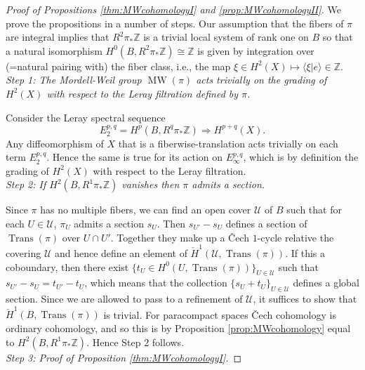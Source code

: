 \documentclass[10pt,letterpaper]{amsart}
\numberwithin{equation}{section}
\def\ZZ{{\mathbb Z}}
\def\Uscr{{\mathscr U}}
\def\la{\langle}
\def\ra{\rangle}
\newcommand\MW{\operatorname{MW}}
\newcommand\Trans{\operatorname{Trans}}
\theoremstyle{remark}
\begin{document}
\begin{proof}[Proof of  Propositions  \ref{thm:MWcohomologyI} and \ref{prop:MWcohomologyII}]
We prove the propositions  in a number of steps.
Our assumption that the fibers of $\pi$ are integral implies that 
$R^2\pi_*\ZZ$ is  a trivial local system of rank one on $B$ so that a natural isomorphism  $H^0(B, R^2\pi_*\ZZ)\cong \ZZ 
$ is given by integration over (=natural pairing with) the fiber class, i.e., the map $\xi\in H^2(X)\mapsto \la \xi|e\ra \in \ZZ$.
\\

\emph{Step 1: The Mordell-Weil group $\MW(\pi)$ acts trivially on the grading of $H^2(X)$ with respect to  the Leray filtration defined by $\pi$. }

Consider the Leray spectral sequence
\[
E_2^{p,q}= H^p(B, R^q\pi_*\ZZ)\Rightarrow H^{p+q}(X).
\]  
Any diffeomorphism of $X$ that is a fiberwise-translation acts trivially on each term $E_2^{p,q}$. Hence the same is true for  its action  on $E_\infty^{p,q}$, which is by definition the grading of $H^2(X)$ with respect to  the Leray filtration.  
\\

\emph{Step 2: If $H^{2}(B,R^1\pi_*\ZZ)$ vanishes then $\pi$ admits a section.}

Since $\pi$ has no multiple fibers, we can find  an open cover $\Uscr$ of  $B$ such that  for each $U\in \Uscr$, $\pi_{U}$ admits a section $s_U$. Then $s_{U'}-s_U$ defines a section of $\Trans(\pi)$ over $U\cap U'$. Together they make up a \v{C}ech $1$-cycle relative the covering $\Uscr$ and hence define an element of $\check{H}^1(\Uscr,\Trans(\pi))$. If this a coboundary, then
there exist $\{t_U\in H^0(U, \Trans(\pi))\}_{U\in \Uscr}$ such that $s_{U'}-s_U=t_{U'}-t_U$, which means that the collection $\{s_U+t_U\}_{U\in\Uscr}$ defines a global section. Since we are allowed to pass to a refinement of $\Uscr$, it suffices to show that $\check{H}^1(B,\Trans(\pi))$ is trivial. For paracompact spaces \v{C}ech cohomology is ordinary cohomology, and so this  is  by Proposition \ref{prop:MWcohomology} equal to $H^{2}(B,R^1\pi_*\ZZ)$. 
Hence Step 2 follows.
\\

\emph{Step 3: Proof  of  Proposition \ref{thm:MWcohomologyI}.}


\end{proof}
\end{document}
